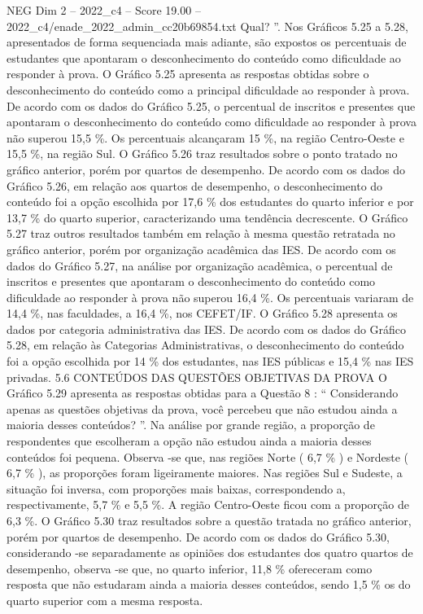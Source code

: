 \begin{textsample}{NEG Dim 2 – 2022\_c4 – Score 19.00 – 2022\_c4/enade\_2022\_admin\_cc20b69854.txt}
Qual? ”.
Nos Gráficos 5.25 a 5.28, apresentados de forma sequenciada mais adiante, são expostos os percentuais de estudantes que apontaram o desconhecimento do conteúdo como dificuldade ao responder à prova.
O Gráfico 5.25 apresenta as respostas obtidas sobre o desconhecimento do conteúdo como a principal dificuldade ao responder à prova.
De acordo com os dados do Gráfico 5.25, o percentual de inscritos e presentes que apontaram o desconhecimento do conteúdo como dificuldade ao responder à prova não superou 15,5 \%.
Os percentuais alcançaram 15 \%, na região Centro-Oeste e 15,5 \%, na região Sul.
O Gráfico 5.26 traz resultados sobre o ponto tratado no gráfico anterior, porém por quartos de desempenho.
De acordo com os dados do Gráfico 5.26, em relação aos quartos de desempenho, o desconhecimento do conteúdo foi a opção escolhida por 17,6 \% dos estudantes do quarto inferior e por 13,7 \% do quarto superior, caracterizando uma tendência decrescente.
O Gráfico 5.27 traz outros resultados também em relação à mesma questão retratada no gráfico anterior, porém por organização acadêmica das IES.
De acordo com os dados do Gráfico 5.27, na análise por organização acadêmica, o percentual de inscritos e presentes que apontaram o desconhecimento do conteúdo como dificuldade ao responder à prova não superou 16,4 \%.
Os percentuais variaram de 14,4 \%, nas faculdades, a 16,4 \%, nos CEFET/IF.
O Gráfico 5.28 apresenta os dados por categoria administrativa das IES.
De acordo com os dados do Gráfico 5.28, em relação às Categorias Administrativas, o desconhecimento do conteúdo foi a opção escolhida por 14 \% dos estudantes, nas IES públicas e 15,4 \% nas IES privadas. 5.6 CONTEÚDOS DAS QUESTÕES OBJETIVAS DA PROVA O Gráfico 5.29 apresenta as respostas obtidas para a Questão 8 : “ Considerando apenas as questões objetivas da prova, você percebeu que não estudou ainda a maioria desses conteúdos? ”.
Na análise por grande região, a proporção de respondentes que escolheram a opção não estudou ainda a maioria desses conteúdos foi pequena.
Observa -se que, nas regiões Norte ( 6,7 \% ) e Nordeste ( 6,7 \% ), as proporções foram ligeiramente maiores.
Nas regiões Sul e Sudeste, a situação foi inversa, com proporções mais baixas, correspondendo a, respectivamente, 5,7 \% e 5,5 \%.
A região Centro-Oeste ficou com a proporção de 6,3 \%.
O Gráfico 5.30 traz resultados sobre a questão tratada no gráfico anterior, porém por quartos de desempenho.
De acordo com os dados do Gráfico 5.30, considerando -se separadamente as opiniões dos estudantes dos quatro quartos de desempenho, observa -se que, no quarto inferior, 11,8 \% ofereceram como resposta que não estudaram ainda a maioria desses conteúdos, sendo 1,5 \% os do quarto superior com a mesma resposta.

\end{textsample}
